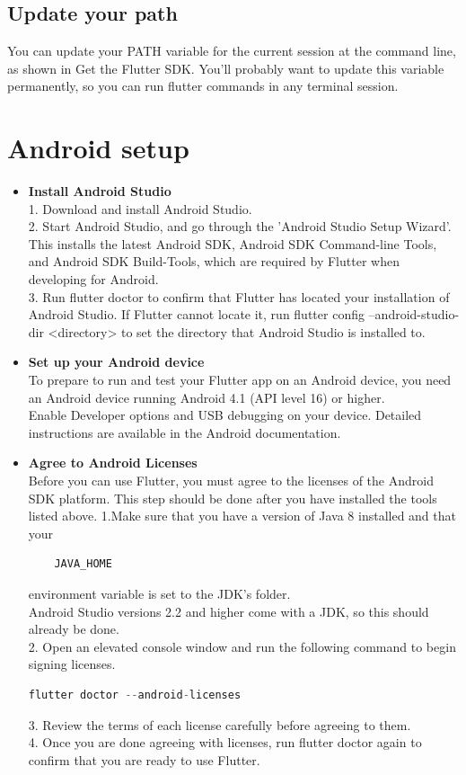 \subsection{Update your path}
You can update your PATH variable for the current session at the command line, as shown in Get the Flutter SDK.
You'll probably want to update this variable permanently, so you can run flutter commands in any terminal session.

\section{Android setup}
\begin{itemize}
	\item \textbf{Install Android Studio}\\
	1. Download and install Android Studio.\\
	2. Start Android Studio, and go through the 'Android Studio Setup Wizard'. This installs the latest Android SDK, Android SDK Command-line Tools, and Android SDK Build-Tools, which are required by Flutter when developing for Android.\\
	3. Run flutter doctor to confirm that Flutter has located your installation of Android Studio. If Flutter cannot locate it, run flutter config --android-studio-dir <directory> to set the directory that Android Studio is installed to.\\
	\item \textbf{Set up your Android device}\\
	To prepare to run and test your Flutter app on an Android device, you need an Android device running Android 4.1 (API level 16) or higher.\\
	Enable Developer options and USB debugging on your device. Detailed instructions are available in the Android documentation.\\
	\item \textbf{ Agree to Android Licenses}\\
	Before you can use Flutter, you must agree to the licenses of the Android SDK platform. This step should be done after you have installed the tools listed above.
	1.Make sure that you have a version of Java 8 installed and that your 
	\begin{lstlisting}
	JAVA_HOME \end{lstlisting}
	 environment variable is set to the JDK’s folder.\\
	Android Studio versions 2.2 and higher come with a JDK, so this should already be done.  \\
	2. Open an elevated console window and run the following command to begin signing licenses.
	\begin{lstlisting}[language=C]
		flutter doctor --android-licenses\end{lstlisting}
	3. Review the terms of each license carefully before agreeing to them.\\
	4. Once you are done agreeing with licenses, run flutter doctor again to confirm that you are ready to use Flutter.\\	
\end{itemize}
